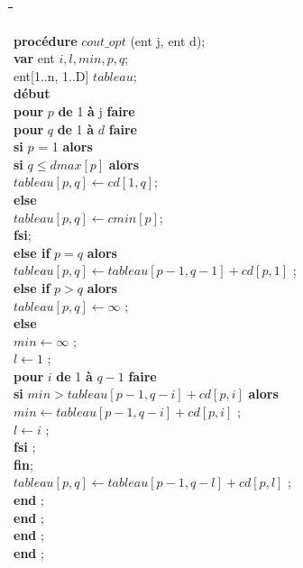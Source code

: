 \documentclass[a4paper, titlepage]{article}
\begin{document}
		\begin{tabbing}

			\hspace{1cm}\=\hspace{1cm}\=\hspace{1cm}\=\hspace{1cm}\=\hspace{1cm}\=\hspace{1cm}\=\hspace{1cm}\=\kill %
			
			\textbf{procédure} $cout\_opt$ (ent j, ent d); \\
			\textbf{var} \> ent $i, l, min, p, q$; \\
			\> ent[1..n, 1..D] $tableau$; \\
			\textbf{début} \\
			\> \textbf{pour} $p$ \textbf{de} 1 \textbf{à} j \textbf{faire} \\
			\>\> \textbf{pour} $q$ \textbf{de} 1 \textbf{à} $d$ \textbf{faire} \\
			\>\>\> \textbf{si} $p$ = 1 \textbf{alors} \\
			\>\>\>\> \textbf{si} $q \le dmax[p]$ \textbf{alors} \\
			\>\>\>\>\> $tableau[p,q] \leftarrow cd[1,q]$; \\
			\>\>\>\> \textbf{else} \\
			\>\>\>\>\> $tableau[p,q] \leftarrow cmin[p]$; \\
			\>\>\>\> \textbf{fsi}; \\
			\>\>\> \textbf{else if} $p = q$ \textbf{alors} \\
			\>\>\>\> $tableau[p,q] \leftarrow tableau[p-1,q-1] + cd[p,1]$ ; \\
			\>\>\> \textbf{else if} $p > q$ \textbf{alors} \\
			\>\>\>\> $tableau[p,q] \leftarrow \infty$ ; \\
			\>\>\> \textbf{else} \\
			\>\>\>\> $min \leftarrow \infty$ ;\\
			\>\>\>\> $l \leftarrow 1$ ; \\
			\>\>\>\> \textbf{pour} $i$ \textbf{de} 1 \textbf{à} $q-1$ \textbf{faire} \\
			\>\>\>\>\> \textbf{si} $min > tableau[p-1, q-i] + cd[p,i]$ \textbf{alors} \\
			\>\>\>\>\>\> $min \leftarrow tableau[p-1, q-i] + cd[p,i]$ ; \\
			\>\>\>\>\>\> $l \leftarrow i$ ; \\
			\>\>\>\>\> \textbf{fsi} ; \\
			\>\>\>\> \textbf{fin}; \\
			\>\>\>\> $tableau[p,q] \leftarrow tableau[p-1,q-l] + cd[p,l]$ ; \\
			\>\>\> \textbf{end} ; \\
			\>\> \textbf{end} ; \\
			\> \textbf{end} ; \\
			\textbf{end} ; \\
			
			
			
		\end{tabbing}
		
\end{document}
